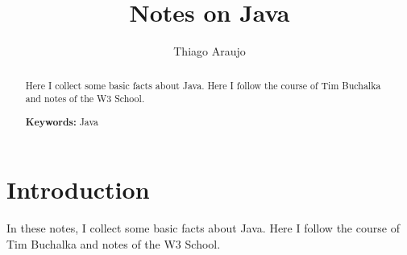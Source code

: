 \documentclass[a4paper,11pt]{amsart}
\begin{document}


\title[Notes on Java]{Notes on Java}

\author{Thiago Araujo}



\begin{abstract}
Here I collect some basic facts about Java. Here I follow the course of Tim Buchalka and notes of 
the W3 School.

\bigskip

\noindent \textbf{Keywords:} Java 
\end{abstract}

\maketitle

\setcounter{tocdepth}{1}
\tableofcontents





\section*{Introduction}

In these notes, I collect some basic facts about Java.
Here I follow the course of Tim Buchalka and notes of 
the W3 School.










\clearpage



\end{document}
